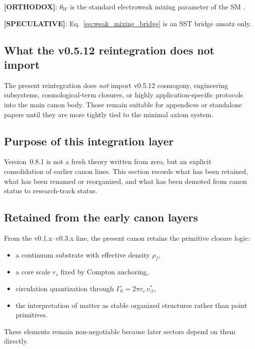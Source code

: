 \documentclass[11pt]{article}
\theoremstyle{definition}
\theoremstyle{plain}
\theoremstyle{remark}
\newcommand{\rhoF}{{\rho_{\!f}}}
\newcommand{\rc}{{r_c}}
\newcommand{\vchar}{v_{\!\boldsymbol{\circlearrowleft}}^{\ast}}
\begin{document}
        \textbf{[ORTHODOX]}: $\theta_W$ is the standard electroweak mixing parameter of the SM \cite{Weinberg1967,PDG2024}.

        \textbf{[SPECULATIVE]}: Eq.~\eqref{eq:weak_mixing_bridge} is an SST bridge ansatz only.

    \subsection{What the v0.5.12 reintegration does not import}

        The present reintegration does \emph{not} import v0.5.12 cosmogony, engineering subsystems, cosmological-term closures, or highly application-specific protocols into the main canon body. Those remain suitable for appendices or standalone papers until they are more tightly tied to the minimal axiom system.

    \subsection{Purpose of this integration layer}
        Version~0.8.1 is not a fresh theory written from zero, but an explicit consolidation of earlier canon lines. This section records what has been retained, what has been renamed or reorganized, and what has been demoted from canon status to research-track status.

    \subsection{Retained from the early canon layers}
        From the v0.1.x--v0.3.x line, the present canon retains the primitive closure logic:
        \begin{itemize}
            \item a continuum substrate with effective density $\rhoF$,
            \item a core scale $r_c$ fixed by Compton anchoring,
            \item circulation quantization through $\Gamma_0 = 2\pi \rc \, \vchar$,
            \item the interpretation of matter as stable organized structures rather than point primitives.
        \end{itemize}
        These elements remain non-negotiable because later sectors depend on them directly.
\end{document}
